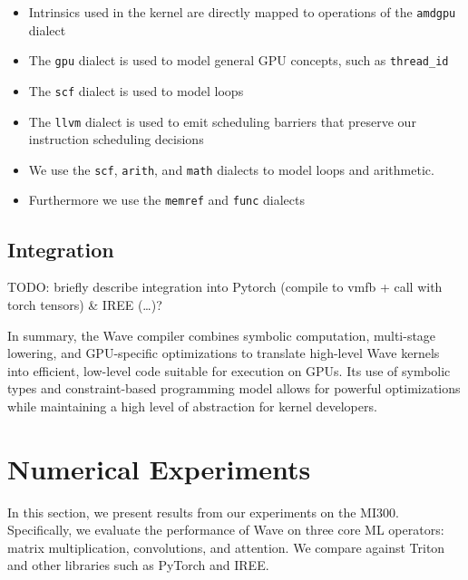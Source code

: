 \documentclass{article}
\begin{document}
\begin{itemize}
    \item Intrinsics used in the kernel are directly mapped to operations of the \texttt{\footnotesize amdgpu} dialect
    \item The \texttt{\footnotesize gpu} dialect is used to model general GPU concepts, such as \texttt{\footnotesize thread\_id}
    \item The \texttt{\footnotesize scf} dialect is used to model loops
    \item The \texttt{\footnotesize llvm} dialect is used to emit scheduling barriers that preserve our instruction scheduling decisions
    \item We use the \texttt{\footnotesize scf}, \texttt{\footnotesize arith}, and \texttt{\footnotesize math} dialects to model loops and arithmetic.
    \item Furthermore we use the \texttt{\footnotesize memref} and \texttt{\footnotesize func} dialects
\end{itemize}




\subsection{Integration}
TODO: briefly describe integration into Pytorch (compile to vmfb + call with torch tensors) \& IREE (\ldots)?



\bigskip
In summary, the Wave compiler combines symbolic computation, multi-stage lowering, and GPU-specific optimizations to translate high-level Wave kernels into efficient, low-level code suitable for execution on GPUs. Its use of symbolic types and constraint-based programming model allows for powerful optimizations while maintaining a high level of abstraction for kernel developers.

\section{Numerical Experiments}
\label{section:numerical_experiments}
In this section, we present results from our experiments on the MI300. Specifically, we evaluate the performance of Wave on three core ML operators: matrix multiplication, convolutions, and attention.
We compare against Triton and other libraries such as PyTorch and IREE.
\end{document}
